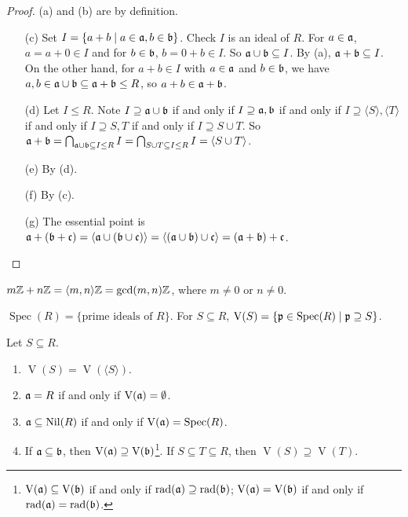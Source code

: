 \begin{proof}
    (a) and (b) are by definition.
    \begin{enumerate}
        \item [(c)]
            Set $I = \{a+b \mid a \in \mathfrak{a},b \in \mathfrak{b}\}$. Check $I$ is an ideal of $R$. For $a \in \mathfrak{a}$, $a = a + 0 \in I$ and for $b \in \mathfrak{b}$, $b = 0 + b \in I$. So $\mathfrak{a} \cup \mathfrak{b} \subseteq I$. By (a), $\mathfrak{a} + \mathfrak{b} \subseteq I$. On the other hand, for $a+b \in I$ with $a \in \mathfrak{a}$ and $b \in \mathfrak{b}$, we have $a,b \in \mathfrak{a} \cup \mathfrak{b} \subseteq \mathfrak{a} + \mathfrak{b} \leq R$, so $a + b \in \mathfrak{a} + \mathfrak{b}$.
        \item[(d)] Let $I \leq R$. Note $I \supseteq \mathfrak{a} \cup \mathfrak{b}$ if and only if $I \supseteq \mathfrak{a},\mathfrak{b}$ if and only if $I \supseteq \langle S \rangle, \langle T \rangle$ if and only if $I \supseteq S,T$ if and only if $I \supseteq S \cup T$. So $\mathfrak{a} + \mathfrak{b} = \bigcap_{\mathfrak{a} \cup \mathfrak{b} \subseteq I \leq R} I = \bigcap_{S \cup T \subseteq I \leq R} I = \langle S \cup T \rangle$.
        \item[(e)] By (d).
        \item[(f)] By (c).
        \item[(g)] The essential point is $\mathfrak{a} + (\mathfrak{b} + \mathfrak{c}) = \langle \mathfrak{a} \cup (\mathfrak{b} \cup \mathfrak{c}) \rangle = \langle (\mathfrak{a} \cup \mathfrak{b}) \cup \mathfrak{c} \rangle = (\mathfrak{a} + \mathfrak{b}) + \mathfrak{c}$. \qedhere
    \end{enumerate}
\end{proof}

\begin{example*}
    $m\mathbb{Z} + n\mathbb{Z} = \langle m,n \rangle\mathbb{Z} = \operatorname{gcd}(m,n)\mathbb{Z}$, where $m \neq 0$ or $n \neq 0$.
\end{example*}

\begin{recall*}
    $\operatorname{Spec}(R) = \{\text{prime ideals of $R$}\}$. For $S \subseteq R$, $\operatorname{V}(S) = \{\mathfrak{p} \in \operatorname{Spec}(R) \mid \mathfrak{p} \supseteq S\}$.
\end{recall*}

\begin{proposition}
    Let $S \subseteq R$.
    \begin{enumerate}
        \item $\operatorname{V}(S) = \operatorname{V}(\langle S \rangle)$. 
        \item $\mathfrak{a} = R$ if and only if $\operatorname{V}(\mathfrak{a}) = \emptyset$.
        \item $\mathfrak{a} \subseteq \operatorname{Nil}(R)$ if and only if $\operatorname{V}(\mathfrak{a}) = \operatorname{Spec}(R)$.
        \item If $\mathfrak{a} \subseteq \mathfrak{b}$, then $\operatorname{V}(\mathfrak{a}) \supseteq \operatorname{V}(\mathfrak{b})$\footnote[2]{$\operatorname{V}(\mathfrak{a}) \subseteq \operatorname{V}(\mathfrak{b})$ if and only if $\operatorname{rad}(\mathfrak{a}) \supseteq \operatorname{rad}(\mathfrak{b})$; $\operatorname{V}(\mathfrak{a}) = \operatorname{V}(\mathfrak{b})$ if and only if $\operatorname{rad}(\mathfrak{a}) = \operatorname{rad}(\mathfrak{b})$.}. If $S \subseteq T \subseteq R$, then $\operatorname{V}(S) \supseteq \operatorname{V}(T)$.
    \end{enumerate}
\end{proposition}


